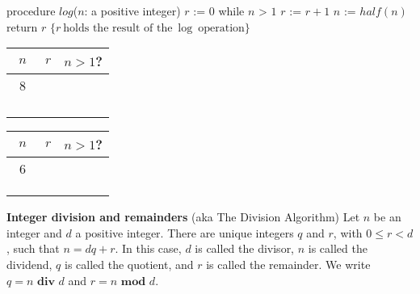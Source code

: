 \documentclass[12pt, oneside]{article}
\begin{document}
\vfill 

 \begin{algorithm}[caption={Algorithm for calculating integer part of $\log$}]
    procedure $\textit{log}$($n$: a positive integer)
    $r$ := $0$
    while $n$ > $1$
      $r$ := $r + 1$
      $n$ := $half(n)$
    return $r$ $\{ r~\textrm{holds the result of the}~\log~\textrm{operation}\} $
\end{algorithm}

\begin{multicols}{2}
  \begin{center}
    \begin{tabular}{c|c|c}
    $n$ & $r$  & $n > 1$?\\
    \hline 
    ~$8$~ & \phantom{~$0$~} & \phantom{~T~}\\
    \phantom{$4$} & \phantom{$1$} & \phantom{T}\\
    \phantom{$2$} & \phantom{$2$} & \phantom{T}\\
    \phantom{$1$} & \phantom{$3$} & \phantom{F}\\
    &\\
    \end{tabular}
    \end{center}
  \begin{center}
    \begin{tabular}{c|c|c}
    $n$ & $r$  & $n > 1$?\\
    \hline 
    ~$6$~ & \phantom{~$0$~} & \phantom{~T~}\\
    \phantom{$3$} & \phantom{$1$} & \phantom{T}\\
    \phantom{$1$} & \phantom{$2$} & \phantom{F}\\
    &\\
    \end{tabular}
    \end{center}
\end{multicols}

\vfill

 \newpage


{\bf Integer division and remainders} (aka The Division Algorithm) Let $n$ be an integer 
and $d$ a positive integer. There are unique integers $q$ and $r$, with $0 \leq r < d$, such that 
$n = dq + r$. In this case, $d$ is called the divisor, $n$ is called the dividend, 
$q$ is called the quotient, 
and $r$ is called the remainder. We write $q=n \textbf{ div } d$ and $r=n \textbf{ mod } d$.
\end{document}
